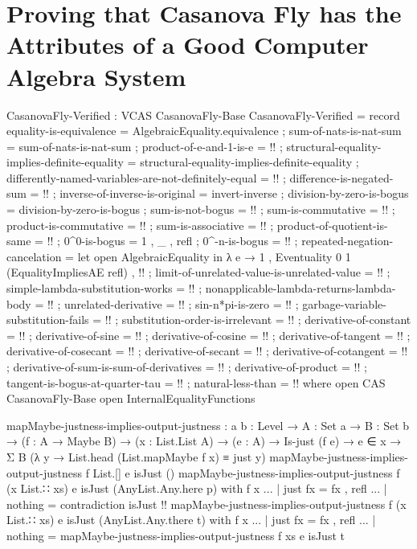 \documentclass{report}
\begin{document}
\chapter{Proving that Casanova Fly has the Attributes of a Good Computer Algebra System}

\begin{code}
CasanovaFly-Verified : VCAS CasanovaFly-Base
CasanovaFly-Verified = record
  { equality-is-equivalence = AlgebraicEquality.equivalence
  ; sum-of-nats-is-nat-sum = sum-of-nats-is-nat-sum
  ; product-of-e-and-1-is-e = {!!}
  ; structural-equality-implies-definite-equality =
    structural-equality-implies-definite-equality
  ; differently-named-variables-are-not-definitely-equal = {!!}
  ; difference-is-negated-sum = {!!}
  ; inverse-of-inverse-is-original = invert-inverse
  ; division-by-zero-is-bogus = division-by-zero-is-bogus
  ; sum-is-not-bogus = {!!}
  ; sum-is-commutative = {!!}
  ; product-is-commutative = {!!}
  ; sum-is-associative = {!!}
  ; product-of-quotient-is-same = {!!}
  ; 0^0-is-bogus = 1 , _ , refl
  ; 0^-n-is-bogus = {!!}
  ; repeated-negation-cancelation =
    let open AlgebraicEquality in
    λ e → 1
        , Eventuality 0 1 (EqualityImpliesAE refl)
        , {!!}
  ; limit-of-unrelated-value-is-unrelated-value = {!!}
  ; simple-lambda-substitution-works = {!!}
  ; nonapplicable-lambda-returns-lambda-body = {!!}
  ; unrelated-derivative = {!!}
  ; sin-n*pi-is-zero = {!!}
  ; garbage-variable-substitution-fails = {!!}
  ; substitution-order-is-irrelevant = {!!}
  ; derivative-of-constant = {!!}
  ; derivative-of-sine = {!!}
  ; derivative-of-cosine = {!!}
  ; derivative-of-tangent = {!!}
  ; derivative-of-cosecant = {!!}
  ; derivative-of-secant = {!!}
  ; derivative-of-cotangent = {!!}
  ; derivative-of-sum-is-sum-of-derivatives = {!!}
  ; derivative-of-product = {!!}
  ; tangent-is-bogus-at-quarter-tau = {!!}
  ; natural-less-than = {!!}
  }
  where
  open CAS CasanovaFly-Base
  open InternalEqualityFunctions

  mapMaybe-justness-implies-output-justness :
    {a b : Level} →
    {A : Set a} →
    {B : Set b} →
    (f : A → Maybe B) →
    (x : List.List A) →
    (e : A) →
    Is-just (f e) →
    e ∈ x →
    Σ B (λ y → List.head (List.mapMaybe f x) ≡ just y)
  mapMaybe-justness-implies-output-justness
    f List.[] e isJust ()
  mapMaybe-justness-implies-output-justness
    f (x List.∷ xs) e isJust (AnyList.Any.here p) with f x
  ... | just fx = fx , refl
  ... | nothing = contradiction isJust {!!}
  mapMaybe-justness-implies-output-justness
    f (x List.∷ xs) e isJust (AnyList.Any.there t) with f x
  ... | just fx = fx , refl
  ... | nothing = mapMaybe-justness-implies-output-justness f xs e isJust t


\end{code}
\end{document}
